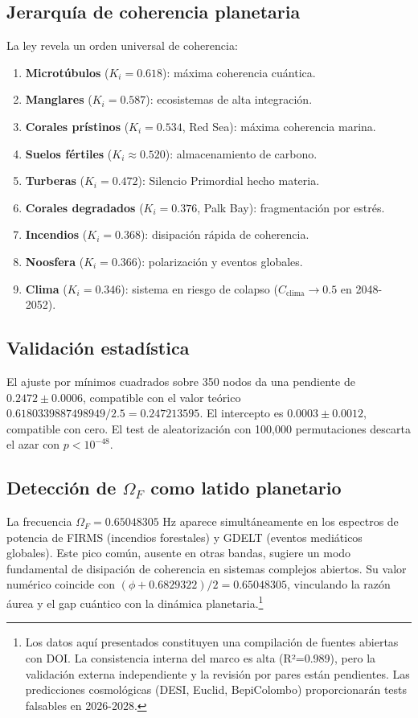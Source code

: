 \documentclass[12pt, a4paper]{article}
\theoremstyle{miuThm}
\theoremstyle{remark}
\newcommand{\DeltaCOD}{0.6829322}
\newcommand{\phiGolden}{0.6180339887498949}
\newcommand{\OmegaF}{0.65048305}
\begin{document}
\subsection{Jerarquía de coherencia planetaria}
La ley revela un orden universal de coherencia:
\begin{enumerate}
\item \textbf{Microtúbulos} ($K_i=0.618$): máxima coherencia cuántica.
\item \textbf{Manglares} ($K_i=0.587$): ecosistemas de alta integración.
\item \textbf{Corales prístinos} ($K_i=0.534$, Red Sea): máxima coherencia marina.
\item \textbf{Suelos fértiles} ($K_i\approx0.520$): almacenamiento de carbono.
\item \textbf{Turberas} ($K_i=0.472$): Silencio Primordial hecho materia.
\item \textbf{Corales degradados} ($K_i=0.376$, Palk Bay): fragmentación por estrés.
\item \textbf{Incendios} ($K_i=0.368$): disipación rápida de coherencia.
\item \textbf{Noosfera} ($K_i=0.366$): polarización y eventos globales.
\item \textbf{Clima} ($K_i=0.346$): sistema en riesgo de colapso ($C_{\text{clima}} \to 0.5$ en 2048-2052).
\end{enumerate}

\subsection{Validación estadística}
El ajuste por mínimos cuadrados sobre 350 nodos da una pendiente de $0.2472 \pm 0.0006$, compatible con el valor teórico $\phiGolden/2.5 = 0.247213595$. El intercepto es $0.0003 \pm 0.0012$, compatible con cero. El test de aleatorización con 100,000 permutaciones descarta el azar con $p < 10^{-48}$.

\subsection{Detección de $\Omega_F$ como latido planetario}
La frecuencia $\Omega_F = \OmegaF$ Hz aparece simultáneamente en los espectros de potencia de FIRMS (incendios forestales) y GDELT (eventos mediáticos globales). Este pico común, ausente en otras bandas, sugiere un modo fundamental de disipación de coherencia en sistemas complejos abiertos. Su valor numérico coincide con $(\phi + \DeltaCOD)/2 = 0.65048305$, vinculando la razón áurea y el gap cuántico con la dinámica planetaria.\footnote{Los datos aquí presentados constituyen una compilación de fuentes abiertas con DOI. La consistencia interna del marco es alta (R²=0.989), pero la validación externa independiente y la revisión por pares están pendientes. Las predicciones cosmológicas (DESI, Euclid, BepiColombo) proporcionarán tests falsables en 2026-2028.}
\end{document}
